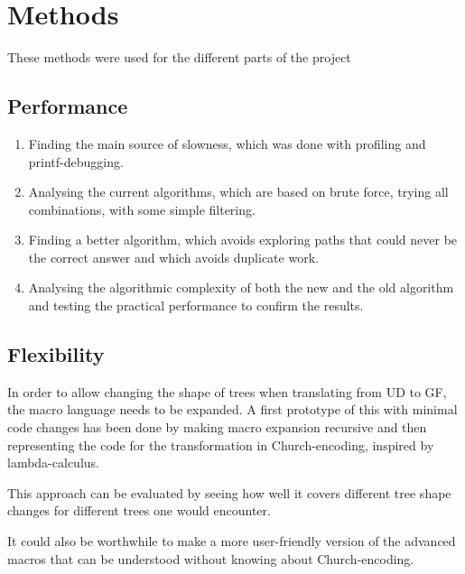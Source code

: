 \chapter{Methods}



These methods were used for the different parts of the project

\section{Performance}

\begin{enumerate}
    \item 
Finding the main source of slowness, which was done with profiling and printf-debugging.
    \item 
Analysing the current algorithms, which are based on brute force, trying all combinations, with some simple filtering.
    \item 
Finding a better algorithm, which avoids exploring paths that could never be the correct answer and which avoids duplicate work.
    \item 
Analysing the algorithmic complexity of both the new and the old algorithm and testing the practical performance to confirm the results.
\end{enumerate}

\section{Flexibility}

In order to allow changing the shape of trees when translating from UD to GF, the macro language needs to be expanded.
A first prototype of this with minimal code changes has been done by making macro expansion recursive and then representing the code for the transformation in Church-encoding, inspired by lambda-calculus.

This approach can be evaluated by seeing how well it covers different tree shape changes for different trees one would encounter.

It could also be worthwhile to make a more user-friendly version of the advanced macros that can be understood without knowing about Church-encoding.

